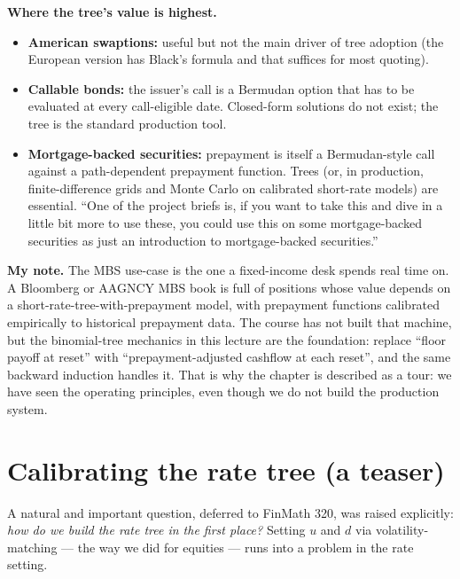 \begin{keyblock}
\textbf{Where the tree's value is highest.}
\begin{itemize}
  \item \textbf{American swaptions:} useful but not the main driver
        of tree adoption (the European version has Black's formula
        and that suffices for most quoting).
  \item \textbf{Callable bonds:} the issuer's call is a Bermudan
        option that has to be evaluated at every call-eligible date.
        Closed-form solutions do not exist; the tree is the
        standard production tool.
  \item \textbf{Mortgage-backed securities:} prepayment is itself a
        Bermudan-style call against a path-dependent prepayment
        function. Trees (or, in production, finite-difference grids
        and Monte Carlo on calibrated short-rate models) are
        essential. ``One of the project briefs is, if you want to
        take this and dive in a little bit more to use these, you
        could use this on some mortgage-backed securities as just
        an introduction to mortgage-backed securities.''
\end{itemize}
\end{keyblock}

\begin{checkpoint}
\textbf{My note.} The MBS use-case is the one a fixed-income desk
spends real time on. A Bloomberg or AAGNCY MBS book is full of
positions whose value depends on a short-rate-tree-with-prepayment
model, with prepayment functions calibrated empirically to historical
prepayment data. The course has not built that machine, but the
binomial-tree mechanics in this lecture are the foundation: replace
``floor payoff at reset'' with ``prepayment-adjusted cashflow at
each reset'', and the same backward induction handles it. That is
why the chapter is described as a tour: we have seen the operating
principles, even though we do not build the production system.
\end{checkpoint}

\section{Calibrating the rate tree (a teaser)}\label{L8-sec:teaser}

A natural and important question, deferred to FinMath 320, was raised
explicitly: \emph{how do we build the rate tree in the first place?}
Setting $u$ and $d$ via volatility-matching --- the way we did for
equities --- runs into a problem in the rate setting.

